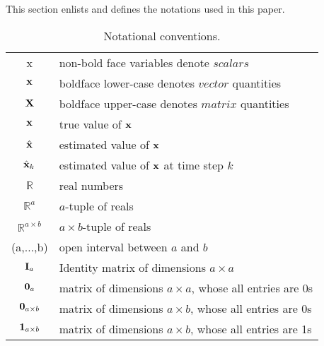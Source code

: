 This section enlists and defines the notations used in this paper.
\begin{table}[h!]
	\centering
	\begin{tabular}[h]{|c|l|}
		\hline
		x 				& non-bold face variables denote $scalars$ 			\T \\
		$\mathbf{x}$ 		& boldface lower-case denotes $vector$ quantities	\T \\ 	
		$\mathbf{X}$ 		& boldface upper-case denotes $matrix$ quantities	\T \\
		$\mathbf{x}$ 		& true value of $\mathbf{x}$ 							\T \\  	
		$\hat{\mathbf{x}}$ 	& estimated value of $\mathbf{x}$						\T \\	
		$\hat{\mathbf{x}}_{k}$ & estimated value of $\mathbf{x}$ at time step $k$	\T \\	
		$\mathbb{R}$ 	& real numbers										\T \\ 	
		$\mathbb{R}^a$ 	& $a$-tuple of reals								\T \\
		$\mathbb{R}^{a \times b}$ 	& $a \times b$-tuple of reals								\T \\
		(a,$\dots$,b) 	& open interval	between $a$ and $b$					\T \\
		$\mathbf{I}_{a}$ 	& Identity matrix of dimensions $a \times a $ \T \\
		$\boldsymbol{0}_{a}$ 		& matrix of dimensions $a \times a $, whose all entries are 0s 	\T \\
		$\boldsymbol{0}_{a \times b}$ 	& matrix of dimensions $a \times b $, whose all entries are 0s 	\T \\
		$\boldsymbol{1}_{a \times b}$ 	& matrix of dimensions $a \times b $, whose all entries are 1s 	\T \\
		\hline
		
	\end{tabular}
	\caption{Notational conventions.}
	\label{table:notation}
\end{table}

\black